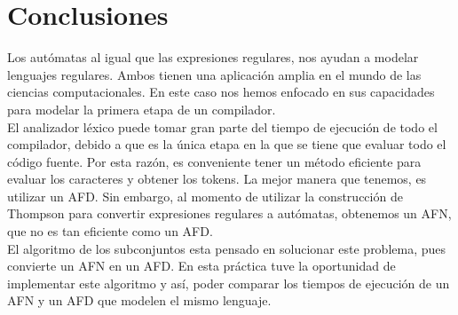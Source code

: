 \section{Conclusiones}

Los autómatas al igual que las expresiones regulares, nos ayudan a modelar lenguajes regulares. Ambos tienen una aplicación amplia en el mundo de las ciencias computacionales. En este caso nos hemos enfocado en sus capacidades para modelar la primera etapa de un compilador. \\

El analizador léxico puede tomar gran parte del tiempo de ejecución de todo el compilador, debido a que es la única etapa en la que se tiene que evaluar todo el código fuente. Por esta razón, es conveniente tener un método eficiente para evaluar los caracteres y obtener los tokens. La mejor manera que tenemos, es utilizar un AFD. Sin embargo, al momento de utilizar la construcción de Thompson para convertir expresiones regulares a autómatas, obtenemos un AFN, que no es tan eficiente como un AFD. \\

El algoritmo de los subconjuntos esta pensado en solucionar este problema, pues convierte un AFN en un AFD. En esta práctica tuve la oportunidad de implementar este algoritmo y así, poder comparar los tiempos de ejecución de un AFN y un AFD que modelen el mismo lenguaje.




